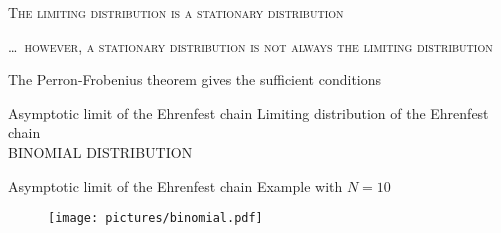 \documentclass[usenames,dvipsnames]{beamer}
\begin{document}
  \begin{frame}[standout]
    \textsc{The limiting distribution is a stationary distribution}
  \end{frame}

  \begin{frame}
    \Large
    \centering
    \dots\ \textsc{however, a stationary distribution is not always the limiting distribution}
    
    \vspace{40pt}

    \normalsize
    The \alert{Perron-Frobenius theorem} gives the sufficient conditions
  \end{frame}

  \begin{frame}{Asymptotic limit of the Ehrenfest chain}
    \Large 
    \centering
    \vspace{30pt}
    Limiting distribution of the Ehrenfest chain\\
    \vspace{20pt}
    \MakeUppercase{\alert{Binomial distribution}}\\
  \end{frame}
  
  \begin{frame}{Asymptotic limit of the Ehrenfest chain}
    \vspace{30pt}
    Example with $N = 10$
    \begin{figure}
      \texttt{[image: pictures/binomial.pdf]}
    \end{figure}
  \end{frame}
\end{document}
